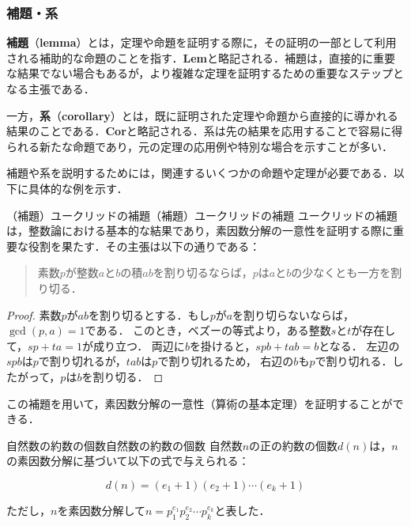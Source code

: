 \documentclass[a4paper,11pt]{ltjsarticle}
\renewcommand{\emph}[1]{\textbf{#1}}
\newenvironment{tleftbar}{\begin{tbleftline}\setlength{\parindent}{1\zw}}{\end{tbleftline}}
\begin{document}
\subsubsection{補題・系}

\emph{補題}（\emph{lemma}）とは，定理や命題を証明する際に，その証明の一部として利用される補助的な命題のことを指す．\textbf{Lem}と略記される．補題は，直接的に重要な結果でない場合もあるが，より複雑な定理を証明するための重要なステップとなる主張である．

一方，\emph{系}（\emph{corollary}）とは，既に証明された定理や命題から直接的に導かれる結果のことである．\textbf{Cor}と略記される．系は先の結果を応用することで容易に得られる新たな命題であり，元の定理の応用例や特別な場合を示すことが多い．

補題や系を説明するためには，関連するいくつかの命題や定理が必要である．以下に具体的な例を示す．

\begin{example}{（補題）ユークリッドの補題}{（補題）ユークリッドの補題}
ユークリッドの補題は，整数論における基本的な結果であり，素因数分解の一意性を証明する際に重要な役割を果たす．その主張は以下の通りである：

\begin{quote}
素数$p$が整数$a$と$b$の積$ab$を割り切るならば，$p$は$a$と$b$の少なくとも一方を割り切る．
\end{quote}

\end{example}

\begin{tleftbar}
\begin{proof}
素数$p$が$ab$を割り切るとする．もし$p$が$a$を割り切らないならば，$\gcd(p, a) = 1$である．
このとき，ベズーの等式より，ある整数$s$と$t$が存在して，$sp + ta = 1$が成り立つ．
両辺に$b$を掛けると，$spb + tab = b$となる．
左辺の$spb$は$p$で割り切れるが，$tab$は$p$で割り切れるため，
右辺の$b$も$p$で割り切れる．したがって，$p$は$b$を割り切る．
\end{proof}
\end{tleftbar}

この補題を用いて，素因数分解の一意性（算術の基本定理）を証明することができる．

\begin{example}{自然数の約数の個数}{自然数の約数の個数}
自然数$n$の正の約数の個数$d(n)$は，$n$の素因数分解に基づいて以下の式で与えられる：

\begin{equation}
d(n) = (e_1 + 1)(e_2 + 1) \dotsm (e_k + 1)
\end{equation}

ただし，$n$を素因数分解して$n = p_1^{e_1} p_2^{e_2} \dotsm p_k^{e_k}$と表した．
\end{example}
\end{document}
